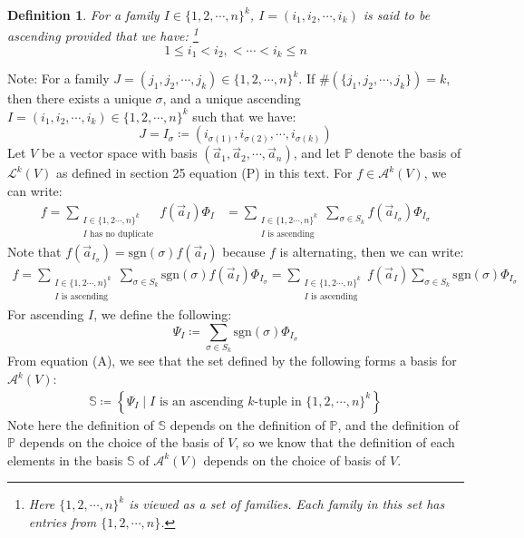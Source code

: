 \documentclass[15pt]{book}
\theoremstyle{break}
\theoremstyle{break}
\newtheorem{defn}{Definition}[corL]
\newcommand{\Lt}{\mathcal{L}}
\newcommand{\A}{\mathcal{A}}
\newcommand{\sgn}{\text{sgn}}
\newcommand{\note}{\color{red}Note: \color{black}}
\begin{document}
\begin{defn}
For a family $I \in \{1,2,\cdots, n\}^k$, $I=(i_1,i_2,\cdots, i_k)$ is said to be ascending provided that we have: \footnote{Here $\{1,2,\cdots, n\}^k$ is viewed as a set of families. Each family in this set has entries from $\{1,2,\cdots, n\}$.} $$1\leq i_1< i_2,<\cdots <i_k\leq n$$ 
\end{defn}
\hfill\break
\note For a family $J=(j_1,j_2,\cdots, j_k) \in \{1,2,\cdots, n\}^k$. If $\#(\{j_1,j_2,\cdots, j_k\}) = k$, then there exists a unique $\sigma$, and a unique ascending $I=(i_1,i_2,\cdots, i_k) \in \{1,2,\cdots, n\}^k$ such that we have:
$$J = I_\sigma  \coloneqq (i_{\sigma(1)}, i_{\sigma(2)},\cdots, i_{\sigma(k)}) $$
Let $V$ be a vector space with basis $(\vec{a}_1,\vec{a}_2, \cdots, \vec{a}_n)$, and let $\mathbb{P}$ denote the basis of $\Lt^k(V)$ as defined in section 25 equation (P) in this text. For $f \in \A^k(V)$, we can write:
\begin{align*}
f = \sum\limits_{\substack{I \in \{1,2\cdots,n\}^k \\ I \text{ has no duplicate}}} f(\vec{a}_I) \Phi_I &= \sum\limits_{\substack{I \in \{1,2\cdots,n\}^k \\ I \text{ is ascending}}} \sum_{\sigma \in S_k} f(\vec{a}_{I_\sigma}) \Phi_{I_\sigma}
\end{align*}
Note that $f(\vec{a}_{I_{\sigma}}) = \sgn(\sigma) f(\vec{a}_I)$ because $f$ is alternating, then we can write:
\begin{align*}
f =\sum\limits_{\substack{I \in \{1,2\cdots,n\}^k \\ I \text{ is ascending}}} \sum_{\sigma \in S_k} \sgn (\sigma) f(\vec{a}_{I}) \Phi_{I_\sigma} 
= \sum\limits_{\substack{I \in \{1,2\cdots,n\}^k \\ I \text{ is ascending}}} f(\vec{a}_{I}) \sum_{\sigma \in S_k} \sgn (\sigma)  \Phi_{I_\sigma} \tag{A}  
\end{align*}
For ascending $I$, we define the following: 
$$\Psi_{I}\coloneqq \sum_{\sigma \in S_k} \sgn(\sigma) \Phi_{I_{\sigma}}$$
From equation (A), we see that the set defined by the following forms a basis for $\A^k(V)$:
\begin{align*}
\mathbb{S} \coloneqq \left\{ \Psi_{I} \mid I \text{ is an ascending }k\text{-tuple in }\{1, 2, \cdots, n\}^k\right\}
\end{align*}
Note here the definition of $\mathbb{S}$ depends on the definition of $\mathbb{P}$, and the definition of $\mathbb{P}$ depends on the choice of the basis of $V$, so we know that the definition of each elements in the basis $\mathbb{S}$ of $\A^k(V)$ depends on the choice of basis of $V$.\\
\end{document}
